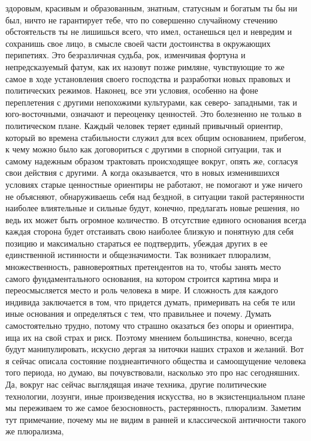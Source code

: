 здоровым, красивым и образованным, знатным, статусным и богатым ты бы ни был,
ничто не гарантирует тебе, что по совершенно случайному стечению обстоятельств
ты не лишишься всего, что имел, останешься цел и невредим и сохранишь свое лицо,
в смысле своей части достоинства в окружающих перипетиях. Это безразличная
судьба, рок, изменчивая фортуна и непредсказуемый фатум, как их назовут позже
римляне, чувствующие то же самое в ходе установления своего господства и
разработки новых правовых и политических режимов. Наконец, все эти условия,
особенно на фоне переплетения с другими непохожими культурами, как северо-
западными, так и юго-восточными, означают и переоценку ценностей. Это болезненно
не только в политическом плане. Каждый человек теряет единый привычный ориентир,
который во времена стабильности служил для всех общим основанием, прибегом, к
чему можно было как договориться с другими в спорной ситуации, так и самому
надежным образом трактовать происходящее вокруг, опять же, согласуя свои
действия с другими. А когда оказывается, что в новых изменившихся условиях
старые ценностные ориентиры не работают, не помогают и уже ничего не объясняют,
обнаруживаешь себя над бездной, в ситуации такой растерянности наиболее
влиятельные и сильные будут, конечно, предлагать новые решения, но ведь их может
быть огромное количество. В отсутствие единого основания всегда каждая сторона
будет отстаивать свою наиболее близкую и понятную для себя позицию и максимально
стараться ее подтвердить, убеждая других в ее единственной истинности и
общезначимости. Так возникает плюрализм, множественность, равновероятных
претендентов на то, чтобы занять место самого фундаментального основания, на
котором строится картина мира и переосмысляется место и роль человека в мире. И
сложность для каждого индивида заключается в том, что придется думать,
примеривать на себя те или иные основания и определяться с тем, что правильнее и
почему. Думать самостоятельно трудно, потому что страшно оказаться без опоры и
ориентира, ища их на свой страх и риск. Поэтому мнением большинства, конечно,
всегда будут манипулировать, искусно дергая за ниточки наших страхов и желаний.
Вот я сейчас описала состояние позднеантичного общества и самоощущение человека
того периода, но думаю, вы почувствовали, насколько это про нас сегодняшних. Да,
вокруг нас сейчас выглядящая иначе техника, другие политические технологии,
лозунги, иные произведения искусства, но в экзистенциальном плане мы переживаем
то же самое безосновность, растерянность, плюрализм. Заметим тут примечание,
почему мы не видим в ранней и классической античности такого же плюрализма,

